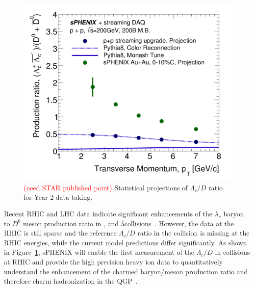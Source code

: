 



\begin{figure}[htbp]
\begin{center}
\includegraphics[width=.49\linewidth]{figs/RAA_DB_theory_root_LcD0Ratio_pp200B.pdf}
\caption{{\textcolor{red}{(need STAR published point)}} Statistical projections of $\Lambda_c/D$ ratio for Year-2 data taking.}
\label{fig:Lc-D0}
\end{center}
\end{figure}



Recent RHIC and LHC data indicate significant enhancements of the
$\lambda_c$ baryon to $D^0$ meson production ratio in \pp,  \pA and
\aa  collisions~\cite{Adam:2019hpq}. However, the data at the RHIC is still sparse and the
reference $\Lambda_c/D$
ratio in the \pp collision is missing at the RHIC energies, while the
current model predictions differ significantly. As shown in
Figure~\ref{fig:Lc-D0}, sPHENIX will enable the first measurement
of the $\Lambda_c/D$ in \pp collisions at RHIC and provide the
high precision heavy ion data to quantitatively understand the enhancement
of the charmed baryon/meson production ratio and therefore charm
hadronization in the QGP~\cite{something}.  


